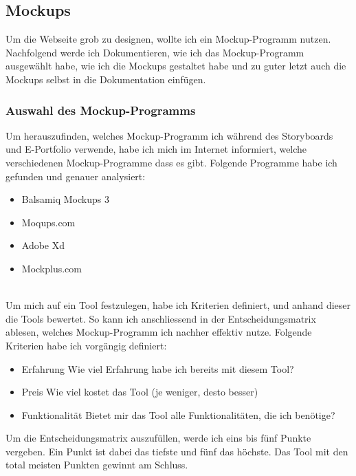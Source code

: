\documentclass[11pt]{article}
\begin{document}
    \pagebreak

    \subsection{Mockups}
    Um die Webseite grob zu designen, wollte ich ein Mockup-Programm nutzen. Nachfolgend werde ich Dokumentieren,
    wie ich das Mockup-Programm ausgewählt habe, wie ich die Mockups gestaltet habe und zu guter letzt auch
    die Mockups selbst in die Dokumentation einfügen.

    \subsubsection{Auswahl des Mockup-Programms}
    Um herauszufinden, welches Mockup-Programm ich während des Storyboards und E-Portfolio verwende, habe ich
    mich im Internet informiert, welche verschiedenen Mockup-Programme dass es gibt. Folgende Programme habe
    ich gefunden und genauer analysiert:

    \begin{itemize}
        \item Balsamiq Mockups 3
        \item Moqups.com
        \item Adobe Xd
        \item Mockplus.com
    \end{itemize}\\
    Um mich auf ein Tool festzulegen, habe ich Kriterien definiert, und anhand dieser die Tools bewertet. So
    kann ich anschliessend in der Entscheidungsmatrix ablesen, welches Mockup-Programm ich nachher effektiv
    nutze. Folgende Kriterien habe ich vorgängig definiert:

    \begin{itemize}
        \item Erfahrung \textrightarrow Wie viel Erfahrung habe ich bereits mit diesem Tool?
        \item Preis \textrightarrow Wie viel kostet das Tool (je weniger, desto besser)
        \item Funktionalität \textrightarrow Bietet mir das Tool alle Funktionalitäten, die ich benötige?
    \end{itemize}
    Um die Entscheidungsmatrix auszufüllen, werde ich eins bis fünf Punkte vergeben. Ein Punkt ist dabei das tiefste
    und fünf das höchste. Das Tool mit den total meisten Punkten gewinnt am Schluss.\\
\end{document}
